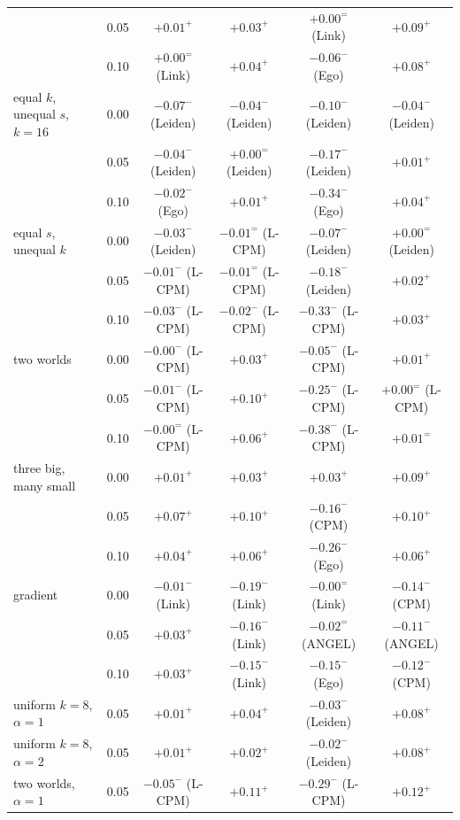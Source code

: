 \begin{table}[t]
\begin{ruledtabular}
\begin{tabular}{llcccc}
 & 0.05 & $+0.01^{+}$ & $+0.03^{+}$ & $+0.00^{=}$ (Link) & $+0.09^{+}$ \\
 & 0.10 & $+0.00^{=}$ (Link) & $+0.04^{+}$ & $-0.06^{-}$ (Ego) & $+0.08^{+}$ \\
\hline
equal $k$, unequal $s$, $k{=}16$ & 0.00 & $-0.07^{-}$ (Leiden) & $-0.04^{-}$ (Leiden) & $-0.10^{-}$ (Leiden) & $-0.04^{-}$ (Leiden) \\
 & 0.05 & $-0.04^{-}$ (Leiden) & $+0.00^{=}$ (Leiden) & $-0.17^{-}$ (Leiden) & $+0.01^{+}$ \\
 & 0.10 & $-0.02^{-}$ (Ego) & $+0.01^{+}$ & $-0.34^{-}$ (Ego) & $+0.04^{+}$ \\
\hline
equal $s$, unequal $k$ & 0.00 & $-0.03^{-}$ (Leiden) & $-0.01^{=}$ (L-CPM) & $-0.07^{-}$ (Leiden) & $+0.00^{=}$ (Leiden) \\
 & 0.05 & $-0.01^{-}$ (L-CPM) & $-0.01^{=}$ (L-CPM) & $-0.18^{-}$ (Leiden) & $+0.02^{+}$ \\
 & 0.10 & $-0.03^{-}$ (L-CPM) & $-0.02^{-}$ (L-CPM) & $-0.33^{-}$ (L-CPM) & $+0.03^{+}$ \\
\hline
two worlds & 0.00 & $-0.00^{-}$ (L-CPM) & $+0.03^{+}$ & $-0.05^{-}$ (L-CPM) & $+0.01^{+}$ \\
 & 0.05 & $-0.01^{-}$ (L-CPM) & $+0.10^{+}$ & $-0.25^{-}$ (L-CPM) & $+0.00^{=}$ (L-CPM) \\
 & 0.10 & $-0.00^{=}$ (L-CPM) & $+0.06^{+}$ & $-0.38^{-}$ (L-CPM) & $+0.01^{=}$ \\
\hline
three big, many small & 0.00 & $+0.01^{+}$ & $+0.03^{+}$ & $+0.03^{+}$ & $+0.09^{+}$ \\
 & 0.05 & $+0.07^{+}$ & $+0.10^{+}$ & $-0.16^{-}$ (CPM) & $+0.10^{+}$ \\
 & 0.10 & $+0.04^{+}$ & $+0.06^{+}$ & $-0.26^{-}$ (Ego) & $+0.06^{+}$ \\
\hline
gradient & 0.00 & $-0.01^{-}$ (Link) & $-0.19^{-}$ (Link) & $-0.00^{=}$ (Link) & $-0.14^{-}$ (CPM) \\
 & 0.05 & $+0.03^{+}$ & $-0.16^{-}$ (Link) & $-0.02^{=}$ (ANGEL) & $-0.11^{-}$ (ANGEL) \\
 & 0.10 & $+0.03^{+}$ & $-0.15^{-}$ (Link) & $-0.15^{-}$ (Ego) & $-0.12^{-}$ (CPM) \\
\hline
uniform $k{=}8$, $\alpha{=}1$ & 0.05 & $+0.01^{+}$ & $+0.04^{+}$ & $-0.03^{-}$ (Leiden) & $+0.08^{+}$ \\
uniform $k{=}8$, $\alpha{=}2$ & 0.05 & $+0.01^{+}$ & $+0.02^{+}$ & $-0.02^{-}$ (Leiden) & $+0.08^{+}$ \\
two worlds, $\alpha{=}1$ & 0.05 & $-0.05^{-}$ (L-CPM) & $+0.11^{+}$ & $-0.29^{-}$ (L-CPM) & $+0.12^{+}$ \\

\end{tabular}
\end{ruledtabular}
\end{table}
